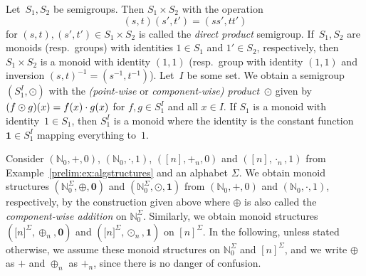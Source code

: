 Let~$S_1, S_2$ be semigroups.
Then $S_1 \times S_2$ with the operation
\[
(s, t)(s', t') = (ss', tt') 
\]
for $(s,t), (s', t') \in S_1 \times S_2$ is called the \emph{direct product} semigroup.
If~$S_1, S_2$ are monoids (resp.~groups) with identities $1 \in S_1$ and $1' \in S_2$, respectively,
then $S_1 \times S_2$ is a monoid with identity $(1,1)$
(resp.~group with identity $(1,1)$ and  inversion $(s,t)^{-1} = (s^{-1}, t^{-1})$).
Let~$I$ be some set. We obtain a 
semigroup $(S_1^I, \odot)$
with the \emph{(point-wise} or \emph{component-wise) product}~$\odot$ 
given by $\applyfunc{x}{(f \odot  g)} = \applyfunc{x}{f} \cdot \applyfunc{x}{g}$
for $f,g \in S_1^I$ and all $x \in I$.
If $S_1$ is a monoid with identity~$1 \in S_1$,
then $S_1^I$ is a monoid where the identity is the constant function $\textbf{1}\in S_1^I$
mapping everything to~$1$.

\begin{example} \label{prelim:ex:component-wise}
	Consider 
	$(\mathbb N_0, +, 0)$, $(\mathbb N_0, \cdot, 1)$,
	$([n], +_n, 0)$ and $([n], \cdot_n, 1)$
	from Example~\ref{prelim:ex:algstructures} and an alphabet $\Sigma$.
	We obtain monoid structures
	$(\mathbb N_0^{\Sigma}, \oplus, \textbf{0})$
	and $(\mathbb N_0^{\Sigma}, \odot, \textbf{1})$
	from $(\mathbb N_0, +, 0)$ and $(\mathbb N_0, \cdot, 1)$, respectively,
	by the construction given above where 
	$\oplus$ is also called the \emph{component-wise addition} on $\mathbb N_0^{\Sigma}$.	
	Similarly, we obtain
	monoid structures 
	$(\mathbb [n]^{\Sigma}, \oplus_n, \textbf{0})$
	and $(\mathbb [n]^{\Sigma}, \odot_n, \textbf{1})$
	on $[n]^{\Sigma}$.
	In the following, unless stated otherwise, 
	we assume these monoid structures on $\mathbb{N}_0^{\Sigma}$ and 
	$[n]^{\Sigma}$, and we write $\oplus$ as $+$ and $\oplus_n$ as $+_n$, 
	since there is no danger of confusion.
\end{example}
